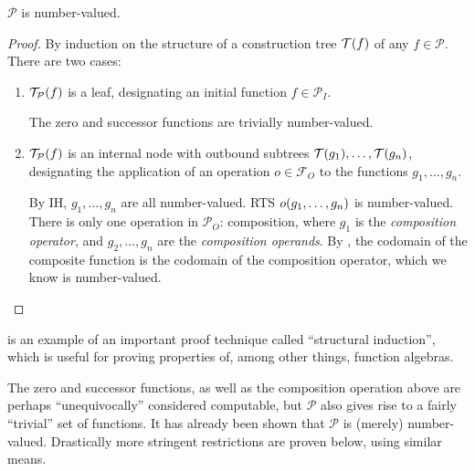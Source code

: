 \begin{theorem} \label{thm:p-number-valued} $\mathcal{P}$ is number-valued.
\end{theorem}

\begin{proof} By induction on the structure of a construction tree
$\mathcal{T}{\mathopen{}\left({f}\right)\mathclose{}}$ of any $f\in \mathcal{P}$. There are two
cases:\begin{enumerate}[label=(\arabic*)]

\item $\mathcal{T}_\mathcal{P}{\mathopen{}\left({f}\right)\mathclose{}}$ is a leaf, designating an initial function
$f \in \mathcal{P}_I$.

The zero and successor functions are trivially number-valued.

\item $\mathcal{T}_\mathcal{P}{\mathopen{}\left({f}\right)\mathclose{}}$ is an internal node with outbound subtrees
$\mathcal{T}{\mathopen{}\left({g_1}\right)\mathclose{}},\ldots,\mathcal{T}{\mathopen{}\left({g_n}\right)\mathclose{}}$, designating the application of
an operation $o \in \mathcal{F}_O$ to the functions $g_1,\ldots,g_n$.

By IH, $g_1,\ldots,g_n$ are all number-valued. RTS $o{\mathopen{}\left({g_1,\ldots,g_n}\right)\mathclose{}}$ is
number-valued. There is only one operation in $\mathcal{P}_O$: composition,
where $g_1$ is the \emph{composition operator}, and $g_2,\ldots,g_n$ are the
\emph{composition operands}. By , the codomain of
the composite function is the codomain of the composition operator, which we
know is number-valued.\end{enumerate}\end{proof}

 is an example of an important proof technique called
``structural induction'', which is useful for proving properties of, among
other things, function algebras.



The zero and successor functions, as well as the composition operation above
are perhaps ``unequivocally'' considered computable, but $\mathcal{P}$ also
gives rise to a fairly ``trivial'' set of functions. It has already been shown
that $\mathcal{P}$ is (merely) number-valued. Drastically more stringent
restrictions are proven below, using similar means.

